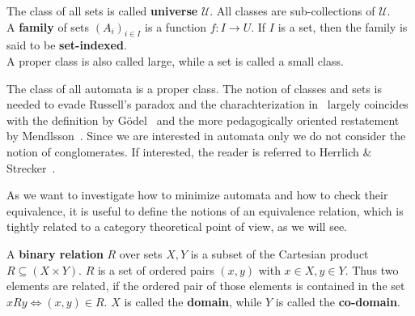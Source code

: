             \begin{definition}
            The class of all sets is called \textbf{universe} $\mathcal{U}$. All classes are sub-collections of $\mathcal{U}$. \\
            A \textbf{family} of sets $(A_i)_{i \in I}$ is a function $f:I \rightarrow U$. If $I$ is a set, then the family is said to be \textbf{set-indexed}. \\
            A proper class is also called large, while a set is called a small class.
            \end{definition}
            
            The class of all automata is a proper class. The notion of classes and sets is needed to evade Russell's paradox and the charachterization in~\autocite{CT1} largely coincides with the definition by Gödel~\autocite{NBG} and the more pedagogically oriented restatement by Mendlsson~\autocite{NBG1}. Since we are interested in automata only we do not consider the notion of conglomerates. If interested, the reader is referred to Herrlich \& Strecker~\autocite{CT2}.
            
            As we want to investigate how to minimize automata and how to check their equivalence, it is useful to define the notions of an equivalence relation, which is tightly related to a category theoretical point of view, as we will see.
            
            \begin{definition}\label{rel}
            A \textbf{binary relation} $R$ over sets $X,Y$ is a subset of the Cartesian product $R \subseteq (X \times Y)$. $R$ is a set of ordered pairs $(x, y)$ with $x \in X, y \in Y$. Thus two elements are related, if the ordered pair of those elements is contained in the set $xRy \Leftrightarrow (x,y) \in R$. $X$ is called the \textbf{domain}, while $Y$ is called the \textbf{co-domain}.
            \end{definition}
            
